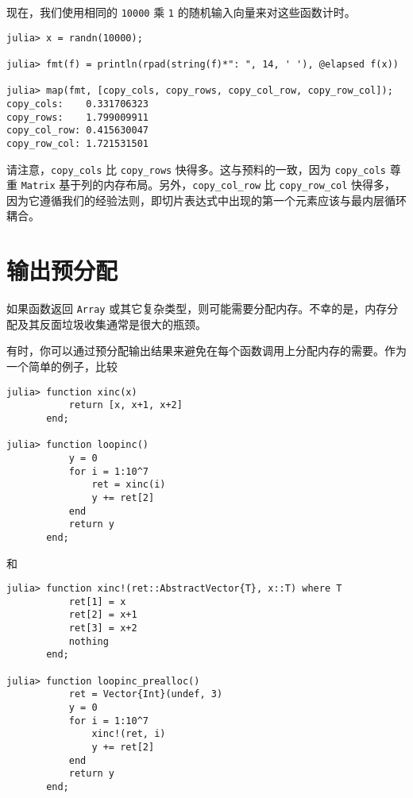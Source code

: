现在，我们使用相同的 \texttt{10000} 乘 \texttt{1} 的随机输入向量来对这些函数计时。




\begin{verbatim}
julia> x = randn(10000);

julia> fmt(f) = println(rpad(string(f)*": ", 14, ' '), @elapsed f(x))

julia> map(fmt, [copy_cols, copy_rows, copy_col_row, copy_row_col]);
copy_cols:    0.331706323
copy_rows:    1.799009911
copy_col_row: 0.415630047
copy_row_col: 1.721531501
\end{verbatim}



请注意，\texttt{copy\_cols} 比 \texttt{copy\_rows} 快得多。这与预料的一致，因为 \texttt{copy\_cols} 尊重 \texttt{Matrix} 基于列的内存布局。另外，\texttt{copy\_col\_row} 比 \texttt{copy\_row\_col} 快得多，因为它遵循我们的经验法则，即切片表达式中出现的第一个元素应该与最内层循环耦合。



\hypertarget{2586641269833759347}{}


\section{输出预分配}



如果函数返回 \texttt{Array} 或其它复杂类型，则可能需要分配内存。不幸的是，内存分配及其反面垃圾收集通常是很大的瓶颈。



有时，你可以通过预分配输出结果来避免在每个函数调用上分配内存的需要。作为一个简单的例子，比较




\begin{verbatim}
julia> function xinc(x)
           return [x, x+1, x+2]
       end;

julia> function loopinc()
           y = 0
           for i = 1:10^7
               ret = xinc(i)
               y += ret[2]
           end
           return y
       end;
\end{verbatim}



和




\begin{verbatim}
julia> function xinc!(ret::AbstractVector{T}, x::T) where T
           ret[1] = x
           ret[2] = x+1
           ret[3] = x+2
           nothing
       end;

julia> function loopinc_prealloc()
           ret = Vector{Int}(undef, 3)
           y = 0
           for i = 1:10^7
               xinc!(ret, i)
               y += ret[2]
           end
           return y
       end;
\end{verbatim}



